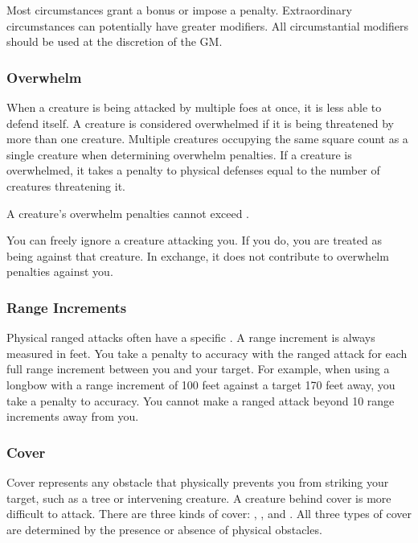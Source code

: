             Most circumstances grant a  bonus or impose a  penalty.
            Extraordinary circumstances can potentially have greater modifiers.
            All circumstantial modifiers should be used at the discretion of the GM.\@

        \subsubsection{Overwhelm}\label{Overwhelm}
            When a creature is being attacked by multiple foes at once, it is less able to defend itself.
            A creature is considered overwhelmed if it is being threatened by more than one creature.
            Multiple creatures occupying the same square count as a single creature when determining overwhelm penalties.
            If a creature is overwhelmed, it takes a penalty to physical defenses equal to the number of creatures threatening it.

            A creature's overwhelm penalties cannot exceed .

             You can freely ignore a creature attacking you.
            If you do, you are treated as being \unaware against that creature.
            In exchange, it does not contribute to overwhelm penalties against you.

        \subsubsection{Range Increments}\label{Range Increments}
            Physical ranged attacks often have a specific .
            A range increment is always measured in feet.
            You take a  penalty to accuracy with the ranged attack for each full range increment between you and your target.
            For example, when using a longbow with a range increment of 100 feet against a target 170 feet away, you take a  penalty to accuracy.
            You cannot make a ranged attack beyond 10 range increments away from you.

        \subsubsection{Cover}\label{Cover}

            Cover represents any obstacle that physically prevents you from striking your target, such as a tree or intervening creature.
            A creature behind cover is more difficult to attack.
            There are three kinds of cover: , , and .
            All three types of cover are determined by the presence or absence of physical obstacles.

